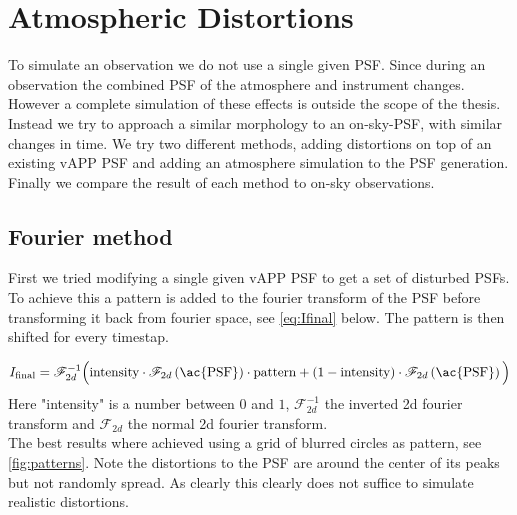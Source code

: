 



\section{Atmospheric Distortions}

To simulate an observation we do not use a single given \ac{PSF}. Since during an observation the combined \ac{PSF}  of the atmosphere and instrument changes. However a complete simulation of these effects is outside the scope of the thesis. Instead we try to approach a similar morphology to an on-sky-\ac{PSF}, with similar changes in time. We try two different methods, adding distortions on top of an existing \ac{vAPP} \ac{PSF} and adding an atmosphere simulation to the PSF generation. Finally we compare the result of each method to on-sky observations.

\subsection{Fourier method}
First we tried modifying a single given \ac{vAPP} \ac{PSF} to get a set of disturbed \acp{PSF}. To achieve this a pattern is added to the fourier transform of the \ac{PSF} before transforming it back from fourier space, see \autoref{eq:Ifinal} below. The pattern is then shifted for every timestap.

\begin{equation}
I_{\text{final}} = \mathscr{F}_{2d}^{-1} \Big( \text{intensity} \cdot \mathscr{F}_{2d}\left(\text{\ac{PSF}}\right) \cdot \text{pattern} + \left(1-\text{intensity}\right) \cdot \mathscr{F}_{2d}\left(\text{\ac{PSF}}\right) \Big) \label{eq:Ifinal}
\end{equation}
Here "intensity" is a number between $0$ and $1$, $\mathscr{F}_{2d}^{-1}$ the inverted 2d fourier transform and $\mathscr{F}_{2d}$ the normal 2d fourier transform.\\

The best results where achieved using a grid of blurred circles as pattern, see \autoref{fig:patterns}. Note the distortions to the \ac{PSF} are around the center of its peaks but not randomly spread. As clearly this clearly does not suffice to simulate realistic distortions.

